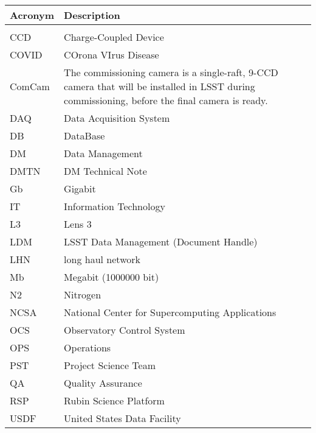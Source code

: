 \addtocounter{table}{-1}
\begin{longtable}{p{}p{}}\hline
\textbf{Acronym} & \textbf{Description}  \\\hline

 &  \\\hline
CCD & Charge-Coupled Device \\\hline
COVID & COrona VIrus Disease \\\hline
ComCam & The commissioning camera is a single-raft, 9-CCD camera that will be installed in LSST during commissioning, before the final camera is ready. \\\hline
DAQ & Data Acquisition System \\\hline
DB & DataBase \\\hline
DM & Data Management \\\hline
DMTN & DM Technical Note \\\hline
Gb & Gigabit \\\hline
IT & Information Technology \\\hline
L3 & Lens 3 \\\hline
LDM & LSST Data Management (Document Handle) \\\hline
LHN & long haul network \\\hline
Mb & Megabit (1000000 bit) \\\hline
N2 & Nitrogen \\\hline
NCSA & National Center for Supercomputing Applications \\\hline
OCS & Observatory Control System \\\hline
OPS & Operations \\\hline
PST & Project Science Team \\\hline
QA & Quality Assurance \\\hline
RSP & Rubin Science Platform \\\hline
USDF & United States Data Facility \\\hline
\end{longtable}
